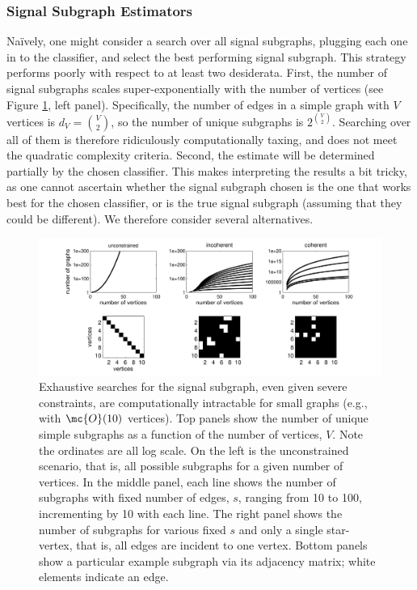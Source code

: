 \documentclass[10pt,journal,cspaper,compsoc]{IEEEtran}
\begin{document}
\subsubsection{Signal Subgraph Estimators} %
\label{ssub:subsubsection_name1}


Na\"{i}vely, one might consider a search over all signal subgraphs, plugging each one in to the classifier, and select the best performing signal subgraph.  This strategy performs poorly with respect to at least two desiderata.  First, the number of signal subgraphs scales super-exponentially with the number of vertices (see Figure \ref{fig:numgraphs}, left panel). Specifically, the number of edges in a simple graph with $V$ vertices is $d_V=\binom{V}{2}$, so the number of unique subgraphs is $2^{\binom{V}{2}}$.  Searching over all of them is therefore ridiculously computationally taxing, and does not meet the quadratic complexity criteria. Second, the estimate will be determined partially by the chosen classifier.  This makes interpreting the results a bit tricky, as one cannot ascertain whether the signal subgraph chosen is the one that works best for the chosen classifier, or is the true signal subgraph (assuming that they could be different).  We therefore consider several alternatives.





\begin{figure}[tb!]
	\centering
		\includegraphics[width=1.0\linewidth]{../figs/num_of_graphs.pdf}
	\caption{Exhaustive searches for the signal subgraph, even given severe constraints, are computationally intractable for small graphs (e.g., with $\mc{O}(10)$ vertices).  Top panels show the number of unique simple subgraphs as a function of the number of vertices, $V$.  Note the ordinates are all log scale.   On the left is the unconstrained scenario, that is, all possible subgraphs for a given number of vertices.  In the middle panel, each line shows the number of subgraphs with fixed number of edges, $s$, ranging from 10 to 100, incrementing by 10 with each line.  The right panel shows the number of subgraphs for various fixed $s$ and only a single star-vertex, that is, all edges are incident to one vertex.  Bottom panels show a particular example subgraph via its adjacency matrix; white elements indicate an edge.}
	\label{fig:numgraphs}
\end{figure}
\end{document}
